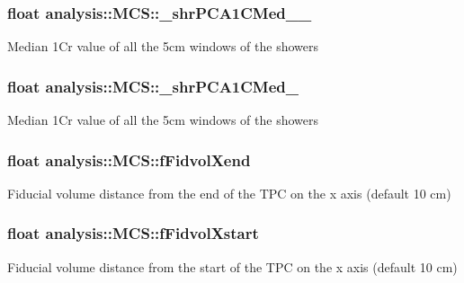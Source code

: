 \subsubsection[{\texorpdfstring{\+\_\+shr\+P\+C\+A1\+C\+Med\+\_\+2\+\_\+5cm}{_shrPCA1CMed_2_5cm}}]{\setlength{\rightskip}{0pt plus 5cm}float analysis\+::\+M\+C\+S\+::\+\_\+shr\+P\+C\+A1\+C\+Med\+\_\+\_\+5cm\hspace{0.3cm}{\ttfamily [private]}}\hypertarget{classanalysis_1_1MCS_ab1b624d070593362e5a1abaf7a96547d}{}\label{classanalysis_1_1MCS_ab1b624d070593362e5a1abaf7a96547d}
Median 1\+Cr value of all the 5cm windows of the showers 
\subsubsection[{\texorpdfstring{\+\_\+shr\+P\+C\+A1\+C\+Med\+\_\+5cm}{_shrPCA1CMed_5cm}}]{\setlength{\rightskip}{0pt plus 5cm}float analysis\+::\+M\+C\+S\+::\+\_\+shr\+P\+C\+A1\+C\+Med\+\_\+5cm\hspace{0.3cm}{\ttfamily [private]}}\hypertarget{classanalysis_1_1MCS_a801eb7a99c0352cfae2a7cdbddbbd09f}{}\label{classanalysis_1_1MCS_a801eb7a99c0352cfae2a7cdbddbbd09f}
Median 1\+Cr value of all the 5cm windows of the showers 
\subsubsection[{\texorpdfstring{f\+Fidvol\+Xend}{fFidvolXend}}]{\setlength{\rightskip}{0pt plus 5cm}float analysis\+::\+M\+C\+S\+::f\+Fidvol\+Xend\hspace{0.3cm}{\ttfamily [private]}}\hypertarget{classanalysis_1_1MCS_aa92a82125d65dd78af1aaf113a5d133c}{}\label{classanalysis_1_1MCS_aa92a82125d65dd78af1aaf113a5d133c}
Fiducial volume distance from the end of the T\+PC on the x axis (default 10 cm) 
\subsubsection[{\texorpdfstring{f\+Fidvol\+Xstart}{fFidvolXstart}}]{\setlength{\rightskip}{0pt plus 5cm}float analysis\+::\+M\+C\+S\+::f\+Fidvol\+Xstart\hspace{0.3cm}{\ttfamily [private]}}\hypertarget{classanalysis_1_1MCS_af61ffe62b59b7f0eacca5603a1f4258e}{}\label{classanalysis_1_1MCS_af61ffe62b59b7f0eacca5603a1f4258e}
Fiducial volume distance from the start of the T\+PC on the x axis (default 10 cm) 
